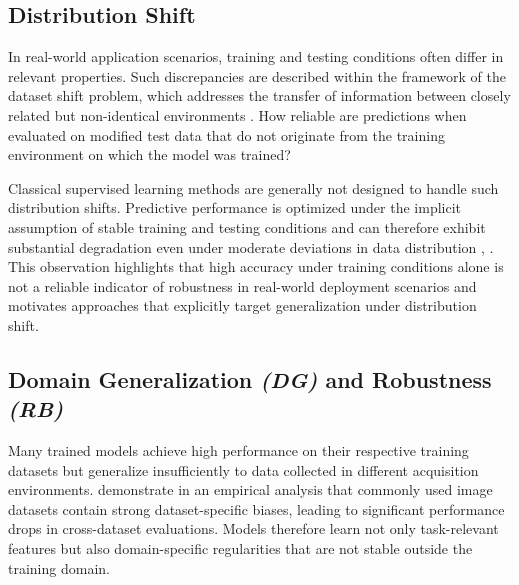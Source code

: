 
\subsection{Distribution Shift}
In real-world application scenarios, training and testing conditions often differ in relevant properties. 
Such discrepancies are described within the framework of the dataset shift problem, which addresses the transfer of information between closely related but non-identical environments \citep[pp.~4--5]{quinonero-candelaDatasetShiftMachine2008}. 
How reliable are predictions when evaluated on modified test data that do not originate from the training environment on which the model was trained?

Classical supervised learning methods are generally not designed to handle such distribution shifts. 
Predictive performance is optimized under the implicit assumption of stable training and testing conditions and can therefore exhibit substantial degradation even under moderate deviations in data distribution \citep[p.~28]{quinonero-candelaDatasetShiftMachine2008}, \citep{zhouDomainGeneralizationSurvey2023}. 
This observation highlights that high accuracy under training conditions alone is not a reliable indicator of robustness in real-world deployment scenarios and motivates approaches that explicitly target generalization under distribution shift.

\subsection{Domain Generalization \textit{(DG)} and Robustness \textit{(RB)}}
Many trained models achieve high performance on their respective training datasets but generalize insufficiently to data collected in different acquisition environments. 
\citet{torralbaUnbiasedLookDataset2011} demonstrate in an empirical analysis that commonly used image datasets contain strong dataset-specific biases, leading to significant performance drops in cross-dataset evaluations. 
Models therefore learn not only task-relevant features but also domain-specific regularities that are not stable outside the training domain.


